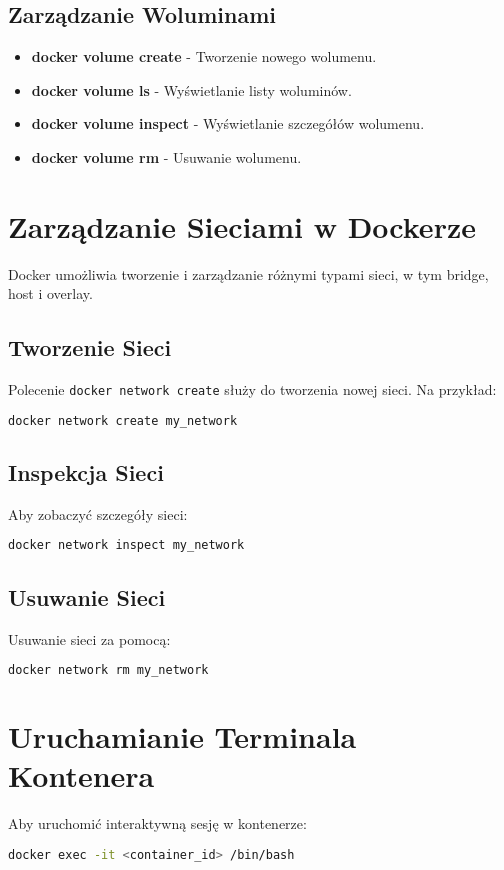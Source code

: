 \documentclass[a4paper,12pt]{article}
\begin{document}
\subsection{Zarządzanie Woluminami}
\begin{itemize}
    \item \textbf{docker volume create} - Tworzenie nowego wolumenu.
    \item \textbf{docker volume ls} - Wyświetlanie listy woluminów.
    \item \textbf{docker volume inspect} - Wyświetlanie szczegółów wolumenu.
    \item \textbf{docker volume rm} - Usuwanie wolumenu.
\end{itemize}

\section{Zarządzanie Sieciami w Dockerze}
Docker umożliwia tworzenie i zarządzanie różnymi typami sieci, w tym bridge, host i overlay.

\subsection{Tworzenie Sieci}
Polecenie \texttt{docker network create} służy do tworzenia nowej sieci. Na przykład:
\begin{lstlisting}[language=bash]
docker network create my_network
\end{lstlisting}

\subsection{Inspekcja Sieci}
Aby zobaczyć szczegóły sieci:
\begin{lstlisting}[language=bash]
docker network inspect my_network
\end{lstlisting}

\subsection{Usuwanie Sieci}
Usuwanie sieci za pomocą:
\begin{lstlisting}[language=bash]
docker network rm my_network
\end{lstlisting}

\section{Uruchamianie Terminala Kontenera}
Aby uruchomić interaktywną sesję w kontenerze:
\begin{lstlisting}[language=bash]
docker exec -it <container_id> /bin/bash
\end{lstlisting}
\end{document}
